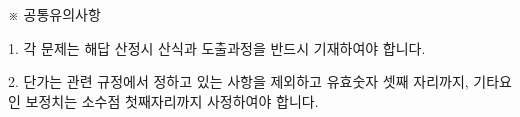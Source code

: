 \begin{framedtext}
※ 공통유의사항 \par
1. 각 문제는 해답 산정시 산식과 도출과정을 반드시 기재하여야 합니다. \par
2. 단가는 관련 규정에서 정하고 있는 사항을 제외하고 유효숫자 셋째 자리까지, 기타요인 보정치는 소수점 첫째자리까지 사정하여야 합니다.
\end{framedtext}
